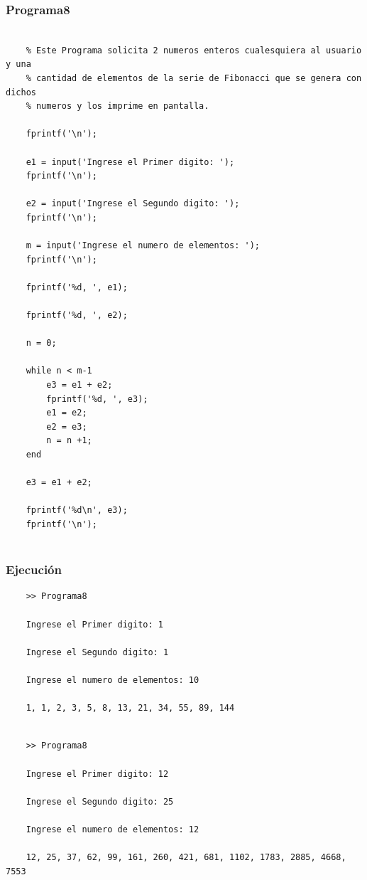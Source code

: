 \documentclass{article}
\begin{document}
	\subsubsection{Programa8}
	
	\begin{lstlisting}
	
	% Este Programa solicita 2 numeros enteros cualesquiera al usuario y una
	% cantidad de elementos de la serie de Fibonacci que se genera con dichos
	% numeros y los imprime en pantalla.
	
	fprintf('\n');
	
	e1 = input('Ingrese el Primer digito: ');
	fprintf('\n');
	
	e2 = input('Ingrese el Segundo digito: ');
	fprintf('\n');
	
	m = input('Ingrese el numero de elementos: ');
	fprintf('\n');
	
	fprintf('%d, ', e1);
	
	fprintf('%d, ', e2);
	
	n = 0;
	
	while n < m-1
		e3 = e1 + e2;
		fprintf('%d, ', e3);
		e1 = e2;
		e2 = e3;
		n = n +1;
	end
	
	e3 = e1 + e2;
	
	fprintf('%d\n', e3);
	fprintf('\n');
	
	\end{lstlisting}
	
	\subsubsection{Ejecución}
	
	\begin{lstlisting}
	>> Programa8
	
	Ingrese el Primer digito: 1
	
	Ingrese el Segundo digito: 1
	
	Ingrese el numero de elementos: 10
	
	1, 1, 2, 3, 5, 8, 13, 21, 34, 55, 89, 144
	
	\end{lstlisting}
	
	\begin{lstlisting}
	>> Programa8
	
	Ingrese el Primer digito: 12
	
	Ingrese el Segundo digito: 25
	
	Ingrese el numero de elementos: 12
	
	12, 25, 37, 62, 99, 161, 260, 421, 681, 1102, 1783, 2885, 4668, 7553
	
	\end{lstlisting}
	
\end{document}
